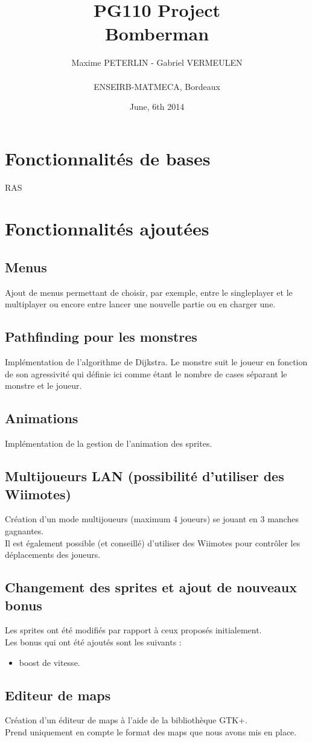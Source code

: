 \documentclass[11pt]{article}
\title{\textbf{PG110 Project}\\Bomberman}
\author{Maxime PETERLIN - Gabriel VERMEULEN \\\\{ENSEIRB-MATMECA, Bordeaux}}
\date{June, 6th 2014}
\begin{document}
\maketitle

\section{Fonctionnalités de bases}

RAS

\section{Fonctionnalités ajoutées}
	\subsection{Menus}
		Ajout de menus permettant de choisir, par exemple, entre le singleplayer et le multiplayer ou encore entre lancer une nouvelle partie ou en charger une.
	\subsection{Pathfinding pour les monstres}
		Implémentation de l'algorithme de Dijkstra. Le monstre suit le joueur en fonction de son agressivité qui définie ici comme étant le nombre de cases séparant le monstre et le joueur.
	\subsection{Animations}
		Implémentation de la gestion de l'animation des sprites.
	\subsection{Multijoueurs LAN (possibilité d'utiliser des Wiimotes)}
		Création d'un mode multijoueurs (maximum 4 joueurs) se jouant en 3 manches gagnantes.\\
		Il est également possible (et conseillé) d'utiliser des Wiimotes pour contrôler les déplacements des joueurs.
	\subsection{Changement des sprites et ajout de nouveaux bonus}
		Les sprites ont été modifiés par rapport à ceux proposés initialement.\\
		Les bonus qui ont été ajoutés sont les suivants :
		\begin{itemize}
			\item boost de vitesse.
		\end{itemize}
	\subsection{Editeur de maps}
		Création d'un éditeur de maps à l'aide de la bibliothèque GTK+.\\
		Prend uniquement en compte le format des maps que nous avons mis en place.
\end{document}
